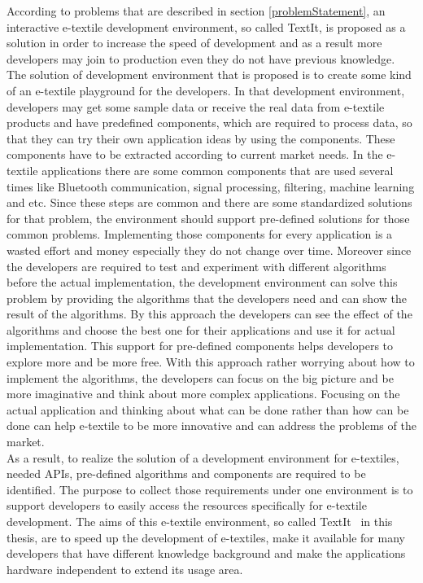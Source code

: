 According to problems that are described in section \ref{problemStatement}, an interactive e-textile development environment, so called TextIt, is proposed as a solution in order to increase the speed of development and as a result more developers may join to production even they do not have previous knowledge. \\ 


The solution of development environment that is proposed is to create some kind of an e-textile playground for the developers. In that development environment, developers may get some sample data or receive the real data from e-textile products and have predefined components, which are required to process data, so that they can try their own application ideas by using the components. These components have to be extracted according to current market needs. In the e-textile applications there are some common components that are used several times like Bluetooth communication, signal processing, filtering, machine learning and etc. Since these steps are common and there are some standardized solutions for that problem, the environment should support pre-defined solutions for those common problems. Implementing those components for every application is a wasted effort and money especially they do not change over time. Moreover since the developers are required to test and experiment with different algorithms before the actual implementation, the development environment can solve this problem by providing the algorithms that the developers need and can show the result of the algorithms. By this approach the developers can see the effect of the algorithms and choose the best one for their applications and use it for actual implementation. This support for pre-defined components helps developers to explore more and be more free. With this approach rather worrying about how to implement the algorithms, the developers can focus on the big picture and be more imaginative and think about more complex applications. Focusing on the actual application and thinking about what can be done rather than how can be done can help e-textile to be more innovative and can address the problems of the market. \\

As a result, to realize the solution of a development environment for e-textiles, needed APIs, pre-defined algorithms and components are required to be identified. The purpose to collect those requirements under one environment is to support developers to easily access the resources specifically for e-textile development. The aims of this e-textile environment, so called TextIt \ in this thesis, are to speed up the development of e-textiles, make it available for many developers that have different knowledge background and make the applications hardware independent to extend its usage area.
